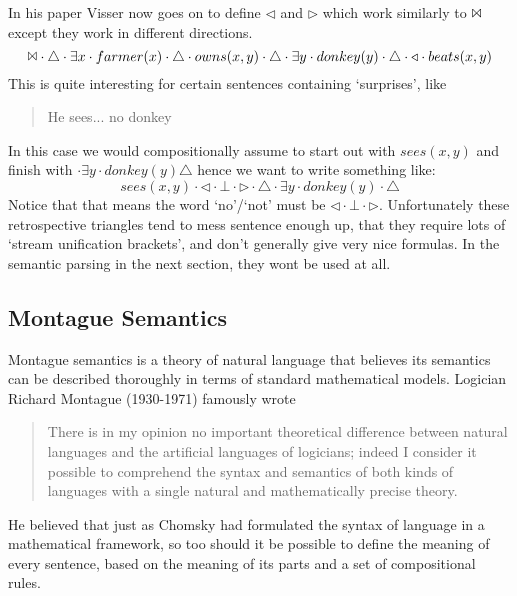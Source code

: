 \documentclass[12pt]{article}
\begin{document}
In his paper Visser now goes on to define $\triangleleft$ and $\triangleright$ which work similarly to $\Bowtie$ except they work in different directions. 
%
\begin{equation}
\Bowtie \cdot \triangle \cdot \exists x \cdot farmer(x) \cdot \triangle \cdot owns(x,y) \cdot \triangle \cdot \exists y \cdot donkey(y) \cdot \triangle \cdot \triangleleft \cdot beats(x,y)
\end{equation}
%
This is quite interesting for certain sentences containing `surprises', like
%
\begin{quotation}
He sees... no donkey
\end{quotation}
%
In this case we would compositionally assume to start out with
$sees(x,y)$ and finish with $\cdot \exists y \cdot donkey(y)\triangle$ hence we want to write something like:
%
\begin{equation}
sees(x,y) \cdot \triangleleft \cdot \bot \cdot \triangleright \cdot \triangle \cdot \exists y \cdot donkey(y) \cdot \triangle
\end{equation}
%
Notice that that means the word `no'/`not' must be $\triangleleft\cdot\bot\cdot\triangleright$. Unfortunately these retrospective triangles tend to mess sentence enough up, that they require lots of `stream unification brackets', and don't generally give very nice formulas. In the semantic parsing in the next section, they wont be used at all.

\subsection{Montague Semantics}
Montague semantics is a theory of natural language that believes its semantics can be described thoroughly in terms of standard mathematical models. Logician Richard Montague (1930-1971) famously wrote
\begin{quotation}
There is in my opinion no important theoretical difference between natural languages and the artificial languages of logicians; indeed I consider it possible to comprehend the syntax and semantics of both kinds of languages with a single natural and mathematically precise theory. \cite{montague1970universal}
\end{quotation}

He believed that just as Chomsky had formulated the syntax of language in a mathematical framework, so too should it be possible to define the meaning of every sentence, based on the meaning of its parts and a set of compositional rules.
\end{document}
